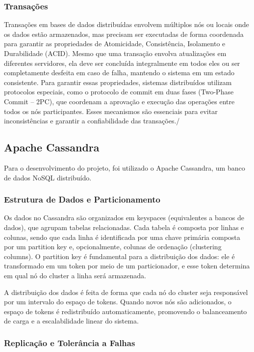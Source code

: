 \subsubsection{Transações}
Transações em bases de dados distribuídas envolvem múltiplos nós ou locais onde os dados estão armazenados, mas precisam ser executadas de forma coordenada para garantir as propriedades de Atomicidade, Consistência, Isolamento e Durabilidade (ACID). Mesmo que uma transação envolva atualizações em diferentes servidores, ela deve ser concluída integralmente em todos eles ou ser completamente desfeita em caso de falha, mantendo o sistema em um estado consistente.
Para garantir essas propriedades, sistemas distribuídos utilizam protocolos especiais, como o protocolo de commit em duas fases (Two-Phase Commit – 2PC), que coordenam a aprovação e execução das operações entre todos os nós participantes. Esses mecanismos são essenciais para evitar inconsistências e garantir a confiabilidade das transações./


\subsection{Apache Cassandra}
Para o desenvolvimento do projeto, foi utilizado o Apache Cassandra, um banco de dados NoSQL distribuído.

\subsubsection{Estrutura de Dados e Particionamento}

Os dados no Cassandra são organizados em keyspaces (equivalentes a bancos de dados),
que agrupam tabelas relacionadas. Cada tabela é composta por linhas e colunas,
sendo que cada linha é identificada por uma chave primária composta por um partition key e, opcionalmente, colunas de ordenação (clustering columns).
O partition key é fundamental para a distribuição dos dados: ele é transformado em um token por meio de um particionador, e esse token determina em qual nó do cluster a linha será armazenada.

A distribuição dos dados é feita de forma que cada nó do cluster seja responsável por um intervalo do espaço de tokens.
Quando novos nós são adicionados, o espaço de tokens é redistribuído automaticamente, promovendo o balanceamento de carga e a escalabilidade linear do sistema.


\subsubsection{Replicação e Tolerância a Falhas}

